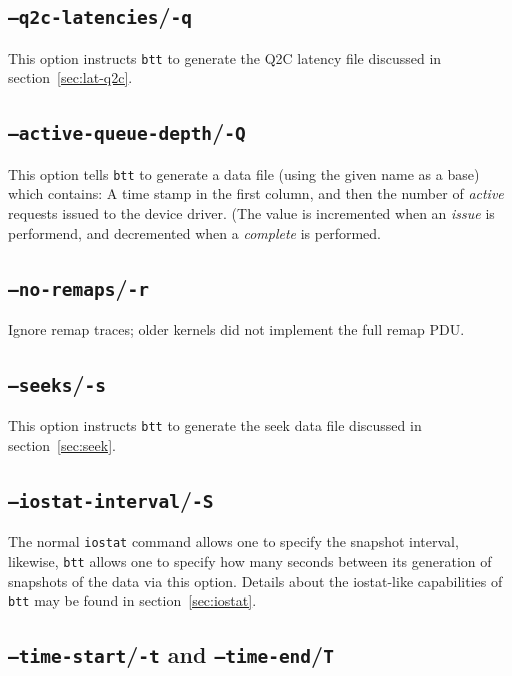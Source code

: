 \documentclass{article}
\begin{document}
\subsection{\label{sec:o-q}\texttt{--q2c-latencies}/\texttt{-q}}

  This option instructs \texttt{btt} to generate the Q2C latency file
  discussed in section~\ref{sec:lat-q2c}.

\subsection{\label{sec:o-Q}\texttt{--active-queue-depth}/\texttt{-Q}}

  This option tells \texttt{btt} to generate a data file (using the given
  name as a base) which contains: A time stamp in the first column,
  and then the number of \emph{active} requests issued to the device
  driver. (The value is incremented when an \emph{issue} is performend,
  and decremented when a \emph{complete} is performed.

\subsection{\label{sec:o-r}\texttt{--no-remaps}/\texttt{-r}}

  Ignore remap traces; older kernels did not implement the full remap PDU.

\subsection{\label{sec:o-s}\texttt{--seeks}/\texttt{-s}}

  This option instructs \texttt{btt} to generate the seek data file
  discussed in section~\ref{sec:seek}.

\subsection{\label{sec:o-S}\texttt{--iostat-interval}/\texttt{-S}}

  The normal \texttt{iostat} command allows one to specify the snapshot
  interval, likewise, \texttt{btt} allows one to specify how many seconds
  between its generation of snapshots of the data via this option. Details
  about the iostat-like capabilities of \texttt{btt} may be found in
  section~\ref{sec:iostat}.

\subsection{\label{sec:o-tT}\texttt{--time-start}/\texttt{-t} and
\texttt{--time-end}/\texttt{T}}
\end{document}
